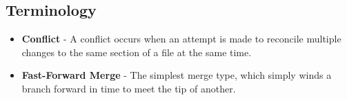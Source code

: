 \subsection{Terminology}
\begin{itemize}
\item\textbf{Conflict} - A conflict occurs when an attempt is made to reconcile multiple changes to the same section of a file at the same time.
\item\textbf{Fast-Forward Merge} - The simplest merge type, which simply winds a branch forward in time to meet the tip of another.
\end{itemize}
